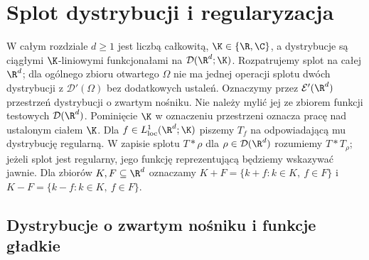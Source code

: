 \setcounter{section}{20}
\section{Splot dystrybucji i regularyzacja}
\label{sec:splot21}

\providecommand{\atlasref}[2]{#2}


W całym rozdziale $d\ge1$ jest liczbą całkowitą,
$\K\in\{\R,\C\}$, a dystrybucje
są ciągłymi $\K$-liniowymi funkcjonałami na
$\mathcal D(\R^d;\K)$. Rozpatrujemy splot na całej
$\R^d$; dla ogólnego zbioru otwartego $\Omega$ nie ma
jednej operacji splotu dwóch dystrybucji z
$\mathcal D'(\Omega)$ bez dodatkowych ustaleń.
Oznaczymy przez $\mathcal E'(\R^d)$ przestrzeń dystrybucji
o zwartym nośniku. Nie należy mylić jej ze zbiorem funkcji
testowych $\mathcal D(\R^d)$. Pominięcie $\K$ w oznaczeniu
przestrzeni oznacza pracę nad ustalonym ciałem $\K$.
Dla $f\in L^1_{\mathrm{loc}}(\R^d;\K)$ piszemy $T_f$ na
odpowiadającą mu dystrybucję regularną. W zapisie splotu
$T*\rho$ dla $\rho\in\mathcal D(\R^d)$ rozumiemy
$T*T_\rho$; jeżeli splot jest regularny, jego funkcję
reprezentującą będziemy wskazywać jawnie.
Dla zbiorów $K,F\subseteq\R^d$ oznaczamy
$K+F=\{k+f:k\in K,\ f\in F\}$ i
$K-F=\{k-f:k\in K,\ f\in F\}$.

\subsection{Dystrybucje o zwartym nośniku i funkcje gładkie}

